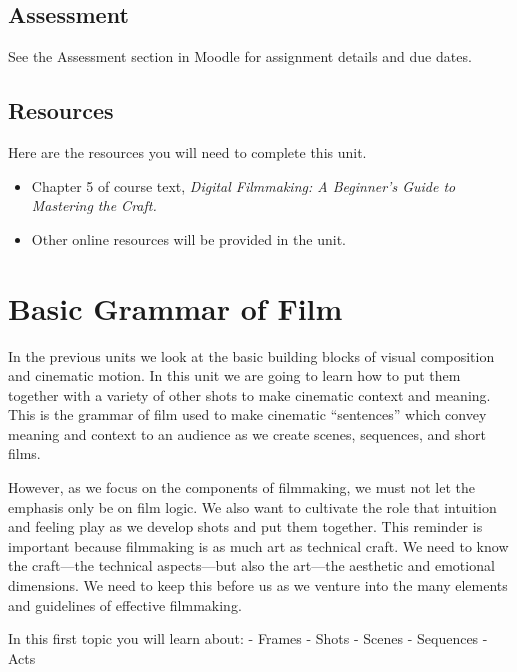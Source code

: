 \documentclass[
]{book}
\providecommand{\tightlist}{%
  \setlength{\itemsep}{0pt}\setlength{\parskip}{0pt}}
\begin{document}
\hypertarget{assessment-8}{%
\subsection*{Assessment}\label{assessment-8}}

See the Assessment section in Moodle for assignment details and due dates.

\hypertarget{resources-4}{%
\subsection*{Resources}\label{resources-4}}

Here are the resources you will need to complete this unit.

\begin{itemize}
\tightlist
\item
  Chapter 5 of course text, \emph{Digital Filmmaking: A Beginner's Guide to Mastering the Craft.}
\item
  Other online resources will be provided in the unit.
\end{itemize}

\hypertarget{basic-grammar-of-film}{%
\section{Basic Grammar of Film}\label{basic-grammar-of-film}}

In the previous units we look at the basic building blocks of visual composition and cinematic motion. In this unit we are going to learn how to put them together with a variety of other shots to make cinematic context and meaning. This is the grammar of film used to make cinematic ``sentences'' which convey meaning and context to an audience as we create scenes, sequences, and short films.

However, as we focus on the components of filmmaking, we must not let the emphasis only be on film logic. We also want to cultivate the role that intuition and feeling play as we develop shots and put them together. This reminder is important because filmmaking is as much art as technical craft. We need to know the craft---the technical aspects---but also the art---the aesthetic and emotional dimensions. We need to keep this before us as we venture into the many elements and guidelines of effective filmmaking.

In this first topic you will learn about:
- Frames
- Shots
- Scenes
- Sequences
- Acts
\end{document}
